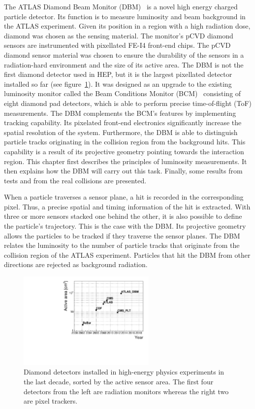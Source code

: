 \documentclass[twoside,12pt]{packages/mytustyle}  %
\begin{document}
The ATLAS Diamond Beam Monitor (DBM)~\cite{} is a novel high energy charged particle detector. Its function is to measure luminosity and beam background in the ATLAS experiment. Given its position in a region with a high radiation dose, diamond was chosen as the sensing material. The monitor's pCVD diamond sensors are instrumented with pixellated FE-I4 front-end chips. The pCVD diamond sensor material was chosen to ensure the durability of the sensors in a radiation-hard environment and the size of its active area. The DBM is not the first diamond detector used in HEP, but it is the largest pixellated detector installed so far (see figure~\ref{fig:areavsyear}). It was designed as an upgrade to the existing luminosity monitor called the Beam Conditions Monitor (BCM)~\cite{} consisting of eight diamond pad detectors, which is able to perform precise time-of-flight (ToF) measurements. The DBM complements the BCM's features by implementing tracking capability. Its pixelated front-end electronics significantly increase the spatial resolution of the system. Furthermore, the DBM is able to distinguish particle tracks originating in the collision region from the background hits. This capability is a result of its projective geometry pointing towards the interaction region. This chapter first describes the principles of luminosity measurements. It then explains how the DBM will carry out this task. Finally, some results from tests and from the real collisions are presented. 

When a particle traverses a sensor plane, a hit is recorded in the corresponding pixel. Thus, a precise spatial and timing information of the hit is extracted. With three or more sensors stacked one behind the other, it is also possible to define the particle's trajectory. This is the case with the DBM. Its projective geometry allows the particles to be tracked if they traverse the sensor planes. The DBM relates the luminosity to the number of particle tracks that originate from the collision region of the ATLAS experiment. Particles that hit the DBM from other directions are rejected as background radiation.

\begin{figure}[!t]
\centering
\includegraphics[width=0.6\textwidth]{../../scripts/04_charge_monitoring/plots/detArea}
\caption{Diamond detectors installed in high-energy physics experiments in the last decade, sorted by the active sensor area. The first four detectors from the left are radiation monitors whereas the right two are pixel trackers.}
\label{fig:areavsyear}
\end{figure}
\end{document}
